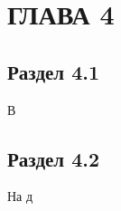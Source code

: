 \chapter[Глава 4]
{ГЛАВА 4}

\section{Раздел 4.1}\par
\hspace*{12.5 mm}В 

\section{Раздел 4.2}
\hspace*{12.5 mm}На д
